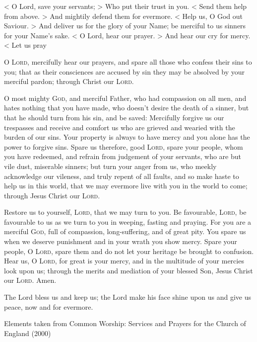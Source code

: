 \documentclass[a5paper]{liturgy}
\begin{document}
\begin{responses}
  < O Lord, save your servants;
  > Who put their trust in you.
  < Send them help from above.
  > And mightily defend them for evermore.
  < Help us, O God out Saviour.
  > And deliver us for the glory of your Name; be merciful to us sinners for your Name's sake.
  < O Lord, hear our prayer.
  > And hear our cry for mercy.
  < Let us pray
\end{responses}

\begin{leader}
  O \textsc{Lord}, mercifully hear our prayers, and spare all those who confess their sins to you; that as their consciences are accused by sin they may be absolved by your merciful pardon; through Christ our \textsc{Lord}. 

  O most mighty \textsc{God}, and merciful Father, who had compassion on all men, and hates nothing that you have made, who doesn't desire the death of a sinner, but that he should turn from his sin, and be saved: Mercifully forgive us our trespasses and receive and comfort us who are grieved and wearied with the burden of our sins. Your property is always to have mercy and you alone has the power to forgive sins. Spare us therefore, good \textsc{Lord}, spare your people, whom you have redeemed, and refrain from judgement of your servants, who are but vile dust, miserable sinners; but turn your anger from us, who meekly acknowledge our vileness, and truly repent of all faults, and so make haste to help us in this world, that we may evermore live with you in the world to come; through Jesus Christ our \textsc{Lord}. 
\end{leader}
\begin{all}
  Restore us to yourself, \textsc{Lord}, that we may turn to you. Be favourable, \textsc{Lord}, be favourable to us as we turn to you in weeping, fasting and praying. For you are a merciful \textsc{God}, full of compassion, long-suffering, and of great pity. You spare us when we deserve punishment and in your wrath you show mercy. Spare your people, O \textsc{Lord}, spare them and do not let your heritage be brought to confusion. Hear us, O \textsc{Lord}, for great is your mercy, and in the multitude of your mercies look upon us; through the merits and mediation of your blessed Son, Jesus Christ our \textsc{Lord}. Amen.
\end{all}
\begin{leader}
  The Lord bless us and keep us; the Lord make his face shine upon us and give us peace, now and for evermore. 
\end{leader}

\vfill

{
  \tiny\noindent
  Elements taken from Common Worship: Services and Prayers for the Church of England (2000)
}
\end{document}
